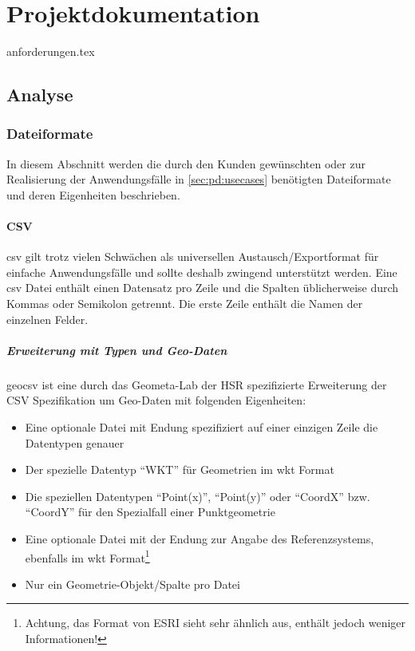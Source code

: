 \part{Projektdokumentation}

{anforderungen.tex}

\chapter{Analyse}


\section{Dateiformate}

In diesem Abschnitt werden die durch den Kunden gewünschten oder zur Realisierung der Anwendungsfälle in \cref{sec:pd:usecases} benötigten Dateiformate und deren Eigenheiten beschrieben.

\subsection{CSV}
\acf{csv} gilt trotz vielen Schwächen als universellen Austausch/Exportformat für einfache Anwendungsfälle und sollte deshalb zwingend unterstützt werden. Eine \acs{csv} Datei enthält einen Datensatz pro Zeile und die Spalten üblicherweise durch Kommas oder Semikolon getrennt. Die erste Zeile enthält die Namen der einzelnen Felder.

\subsubsection{Erweiterung mit Typen und Geo-Daten}

\gls{geocsv} ist eine durch das Geometa-Lab der HSR spezifizierte Erweiterung der CSV Spezifikation um Geo-Daten mit folgenden Eigenheiten\cite{sfkeller,geocsv,gdal-csv}:

\begin{itemize}
\item Eine optionale Datei mit Endung  spezifiziert auf einer einzigen Zeile die Datentypen genauer
\item Der spezielle Datentyp ``WKT'' für Geometrien im \gls{wkt} Format
\item Die speziellen Datentypen ``Point(x)'', ``Point(y)'' oder ``CoordX'' bzw. ``CoordY'' für den Spezialfall einer Punktgeometrie
\item Eine optionale Datei mit der Endung  zur Angabe des Referenzsystems, ebenfalls im \gls{wkt} Format\footnote{Achtung, das  Format von ESRI sieht sehr ähnlich aus, enthält jedoch weniger Informationen!}
\item Nur ein Geometrie-Objekt/Spalte pro Datei
\end{itemize}


